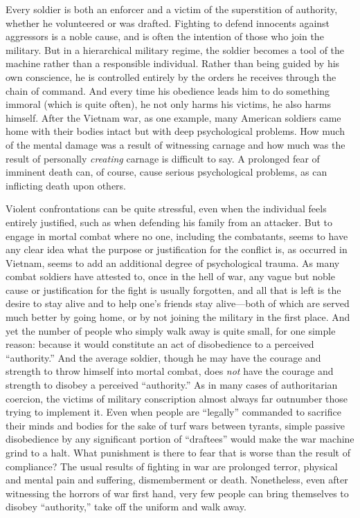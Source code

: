 \documentclass{book}
\begin{document}
Every soldier is both an enforcer and a victim of the superstition of authority, whether he volunteered or was drafted. Fighting to defend innocents against aggressors is a noble cause, and is often the intention of those who join the military. But in a hierarchical military regime, the soldier becomes a tool of the machine rather than a responsible individual. Rather than being guided by his own conscience, he is controlled entirely by the orders he receives through the chain of command. And every time his obedience leads him to do something immoral (which is quite often), he not only harms his victims, he also harms himself. After the Vietnam war, as one example, many American soldiers came home with their bodies intact but with deep psychological problems. How much of the mental damage was a result of witnessing carnage and how much was the result of personally \emph{creating} carnage is difficult to say. A prolonged fear of imminent death can, of course, cause serious psychological problems, as can inflicting death upon others.

Violent confrontations can be quite stressful, even when the individual feels entirely justified, such as when defending his family from an attacker. But to engage in mortal combat where no one, including the combatants, seems to have any clear idea what the purpose or justification for the conflict is, as occurred in Vietnam, seems to add an additional degree of psychological trauma. As many combat soldiers have attested to, once in the hell of war, any vague but noble cause or justification for the fight is usually forgotten, and all that is left is the desire to stay alive and to help one's friends stay alive---both of which are served much better by going home, or by not joining the military in the first place. And yet the number of people who simply walk away is quite small, for one simple reason: because it would constitute an act of disobedience to a perceived \enquote{authority.} And the average soldier, though he may have the courage and strength to throw himself into mortal combat, does \emph{not} have the courage and strength to disobey a perceived \enquote{authority.} As in many cases of authoritarian coercion, the victims of military conscription almost always far outnumber those trying to implement it. Even when people are \enquote{legally} commanded to sacrifice their minds and bodies for the sake of turf wars between tyrants, simple passive disobedience by any significant portion of \enquote{draftees} would make the war machine grind to a halt. What punishment is there to fear that is worse than the result of compliance? The usual results of fighting in war are prolonged terror, physical and mental pain and suffering, dismemberment or death. Nonetheless, even after witnessing the horrors of war first hand, very few people can bring themselves to disobey \enquote{authority,} take off the uniform and walk away.
\end{document}
